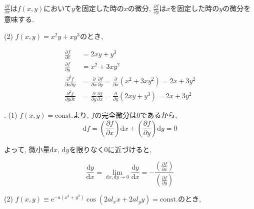 \documentclass[dvipdfmx]{jsarticle}
\begin{document}
$\displaystyle\frac{\partial f}{\partial x}$は$f(x, y)$において$y$を固定した時の$x$の微分,  $\displaystyle\frac{\partial f}{\partial y}$は$x$を固定した時の$y$の微分を意味する. 

(2) $f(x, y) = x^2 y + x y^3$のとき, 

\begin{align*}
    \frac{\partial f}{\partial x} &= 2 x y + y^3 \\
    \frac{\partial f}{\partial y} &= x^2 + 3 x y^2 \\
    \frac{\partial ^2 f}{\partial x \partial y} &= \frac{\partial}{\partial x} \frac{\partial f}{\partial y} = \frac{\partial}{\partial x} (x^2 + 3 x y^2) = 2 x + 3 y^2 \\
    \frac{\partial ^2 f}{\partial y \partial x} &= \frac{\partial}{\partial y} \frac{\partial f}{\partial x} = \frac{\partial}{\partial y} (2 x y + y^3) = 2 x + 3 y^2 
\end{align*}

. (1) $f(x, y) = \mathrm{const.}$より, $f$の完全微分は0であるから, 
\begin{equation*}
    \mathrm{d}f = \left(\frac{\partial{f}}{\partial x}\right) \mathrm{d}x + \left(\frac{\partial{f}}{\partial y}\right) \mathrm{d}y = 0
\end{equation*}

よって, 微小量$\mathrm{d}x$, $\mathrm{d}y$を限りなく0に近づけると, 

\begin{equation*}
    \frac{\mathrm{d}y}{\mathrm{d}x} = \lim_{\mathrm{d}x, \mathrm{d}y \to 0} \frac{\mathrm{d}y}{\mathrm{d}x} = - \frac{\left(\frac{\partial{f}}{\partial{x}}\right)} {\left(\frac{\partial{f}}{\partial{y}}\right)}
\end{equation*}

(2) $f(x, y) \equiv \mathrm{e}^{-a(x^2 + y^2)}\cos{(2 a l_x x + 2 a l_y y)} = \mathrm{const.}$のとき, 
\end{document}
